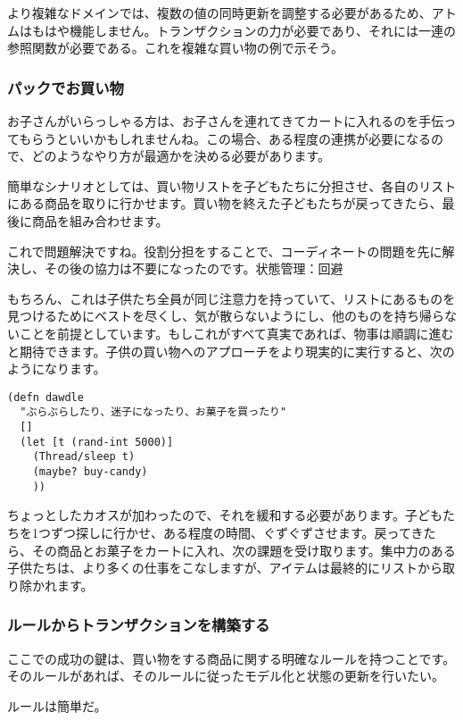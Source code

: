 より複雑なドメインでは、複数の値の同時更新を調整する必要があるため、アトムはもはや機能しません。トランザクションの力が必要であり、それには一連の参照関数が必要である。これを複雑な買い物の例で示そう。


\subsubsection{パックでお買い物}


お子さんがいらっしゃる方は、お子さんを連れてきてカートに入れるのを手伝ってもらうといいかもしれませんね。この場合、ある程度の連携が必要になるので、どのようなやり方が最適かを決める必要があります。

簡単なシナリオとしては、買い物リストを子どもたちに分担させ、各自のリストにある商品を取りに行かせます。買い物を終えた子どもたちが戻ってきたら、最後に商品を組み合わせます。

これで問題解決ですね。役割分担をすることで、コーディネートの問題を先に解決し、その後の協力は不要になったのです。状態管理：回避

もちろん、これは子供たち全員が同じ注意力を持っていて、リストにあるものを見つけるためにベストを尽くし、気が散らないようにし、他のものを持ち帰らないことを前提としています。もしこれがすべて真実であれば、物事は順調に進むと期待できます。子供の買い物へのアプローチをより現実的に実行すると、次のようになります。



\begin{lstlisting}[numbers=none]
(defn dawdle
  "ぶらぶらしたり、迷子になったり、お菓子を買ったり"
  []
  (let [t (rand-int 5000)]
    (Thread/sleep t)
    (maybe? buy-candy)
    ))
\end{lstlisting}

ちょっとしたカオスが加わったので、それを緩和する必要があります。子どもたちを1つずつ探しに行かせ、ある程度の時間、ぐずぐずさせます。戻ってきたら、その商品とお菓子をカートに入れ、次の課題を受け取ります。集中力のある子供たちは、より多くの仕事をこなしますが、アイテムは最終的にリストから取り除かれます。

\subsubsection{ルールからトランザクションを構築する}

ここでの成功の鍵は、買い物をする商品に関する明確なルールを持つことです。そのルールがあれば、そのルールに従ったモデル化と状態の更新を行いたい。

ルールは簡単だ。

